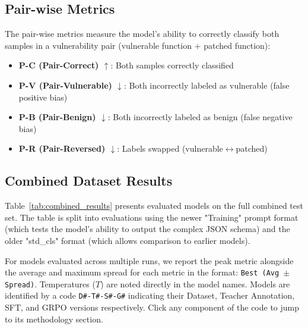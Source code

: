 \documentclass[12pt,a4paper]{article}
\begin{document}
\subsection{Pair-wise Metrics}
The pair-wise metrics measure the model's ability to correctly classify both samples in a vulnerability pair (vulnerable function + patched function):
\begin{itemize}
  \item \textbf{P-C (Pair-Correct) $\uparrow$}: Both samples correctly classified
  \item \textbf{P-V (Pair-Vulnerable) $\downarrow$}: Both incorrectly labeled as vulnerable (false positive bias)
  \item \textbf{P-B (Pair-Benign) $\downarrow$}: Both incorrectly labeled as benign (false negative bias)
  \item \textbf{P-R (Pair-Reversed) $\downarrow$}: Labels swapped (vulnerable$\leftrightarrow$patched)
\end{itemize}

\subsection{Combined Dataset Results}

Table~\ref{tab:combined_results} presents evaluated models on the full combined test set. The table is split into evaluations using the newer "Training" prompt format (which tests the model's ability to output the complex JSON schema) and the older "std\_cls" format (which allows comparison to earlier models). 

For models evaluated across multiple runs, we report the peak metric alongside the average and maximum spread for each metric in the format: \texttt{Best (Avg $\pm$ Spread)}. Temperatures ($T$) are noted directly in the model names. Models are identified by a code \texttt{D\#-T\#-S\#-G\#} indicating their Dataset, Teacher Annotation, SFT, and GRPO versions respectively. Click any component of the code to jump to its methodology section.
\end{document}
